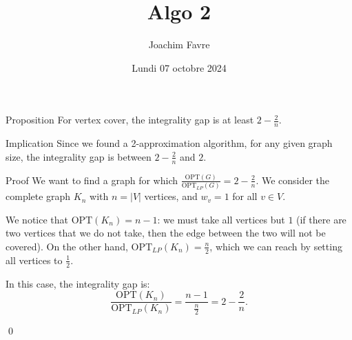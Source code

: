 \documentclass[a4paper]{article}
\title{Algo 2}
\author{Joachim Favre}
\date{Lundi 07 octobre 2024}
\begin{document}
\maketitle


\begin{parag}{Proposition}
    For vertex cover, the integrality gap is at least $2 - \frac{2}{n}$.

    \begin{subparag}{Implication}
        Since we found a 2-approximation algorithm, for any given graph size, the integrality gap is between $2 - \frac{2}{n}$ and $2$.
    \end{subparag}

    \begin{subparag}{Proof}
        We want to find a graph for which $\frac{\text{OPT}\left(G\right)}{\text{OPT}_{LP}\left(G\right)} = 2 - \frac{2}{n}$. We consider the complete graph $K_n$ with $n = \left|V\right|$ vertices, and $w_v = 1$ for all $v \in V$. 

        We notice that $\text{OPT}\left(K_n\right) = n-1$: we must take all vertices but $1$ (if there are two vertices that we do not take, then the edge between the two will not be covered). On the other hand, $\text{OPT}_{LP}\left(K_n\right) = \frac{n}{2}$, which we can reach by setting all vertices to $\frac{1}{2}$. 

       In this case, the integrality gap is: 
       \[\frac{\text{OPT}\left(K_n\right)}{\text{OPT}_{LP}\left(K_n\right)} = \frac{n-1}{\frac{n}{2}} = 2 - \frac{2}{n}.\]

       \qed
    \end{subparag}
\end{parag}
\end{document}
